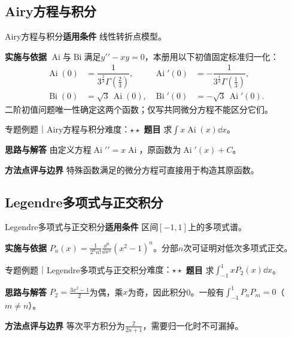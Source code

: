 \subsection{Airy方程与积分}\label{mat:special_integrals:airy}
\begin{method}{Airy方程与积分}\textbf{适用条件} 线性转折点模型。\par\textbf{实施与依据} $\operatorname{Ai}$与$\operatorname{Bi}$满足$y\prime\prime-xy=0$，本册用以下初值固定标准归一化：
\[
\begin{aligned}
\operatorname{Ai}(0)&=\dfrac1{3^{\frac{2}{3}}\Gamma(\frac{2}{3})},&
\operatorname{Ai}'(0)&=-\dfrac1{3^{\frac{1}{3}}\Gamma(\frac{1}{3})},\\
\operatorname{Bi}(0)&=\sqrt3\,\operatorname{Ai}(0),&
\operatorname{Bi}'(0)&=-\sqrt3\,\operatorname{Ai}'(0).
\end{aligned}
\]
二阶初值问题唯一性确定这两个函数；仅写共同微分方程不能区分它们。\end{method}
\begin{example}{专题例题｜Airy方程与积分}{难度：$\star\star$}
\textbf{题目} 求$\int x\operatorname{Ai}(x)\dd x$。\par\textbf{思路与解答} 由定义方程$\operatorname{Ai}\prime\prime=x\operatorname{Ai}$，原函数为$\operatorname{Ai}\prime(x)+C$。\par\textbf{方法点评与边界} 特殊函数满足的微分方程可直接用于构造其原函数。
\end{example}
\subsection{Legendre多项式与正交积分}\label{mat:special_integrals:legendre}
\begin{method}{Legendre多项式与正交积分}\textbf{适用条件} 区间$[-1,1]$上的多项式谱。\par\textbf{实施与依据} $P_n(x)=\frac1{2^nn!}\frac{\dd^n}{\dd x^n}(x^2-1)^n$。分部$n$次可证明对低次多项式正交。\end{method}
\begin{example}{专题例题｜Legendre多项式与正交积分}{难度：$\star\star$}
\textbf{题目} 求$\int_{-1}^1xP_2(x)\dd x$。\par\textbf{思路与解答} $P_2=\frac{3x^2-1}{2}$为偶，乘$x$为奇，因此积分0。一般有$\int_{-1}^1P_nP_m=0$（$m\ne n$）。\par\textbf{方法点评与边界} 等次平方积分为$\frac{2}{2n+1}$，需要归一化时不可漏掉。
\end{example}
